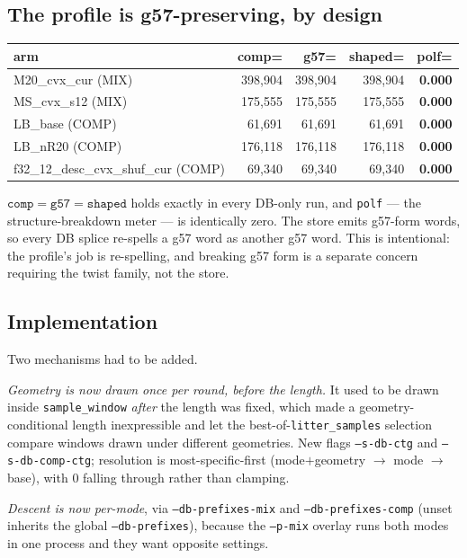 \documentclass[11pt]{article}
\newcommand{\code}[1]{\texttt{#1}}
\begin{document}
\subsection{The profile is g57-preserving, by design}

\begin{center}\small
\begin{tabular}{lrrrr}
\toprule
arm & comp= & g57= & shaped= & polf= \\
\midrule
M20\_cvx\_cur (MIX) & 398{,}904 & 398{,}904 & 398{,}904 & \textbf{0.000} \\
MS\_cvx\_s12 (MIX) & 175{,}555 & 175{,}555 & 175{,}555 & \textbf{0.000} \\
LB\_base (COMP) & 61{,}691 & 61{,}691 & 61{,}691 & \textbf{0.000} \\
LB\_nR20 (COMP) & 176{,}118 & 176{,}118 & 176{,}118 & \textbf{0.000} \\
f32\_12\_desc\_cvx\_shuf\_cur (COMP) & 69{,}340 & 69{,}340 & 69{,}340 & \textbf{0.000} \\
\bottomrule
\end{tabular}
\end{center}

$\code{comp}=\code{g57}=\code{shaped}$ holds exactly in every DB-only run, and
\code{polf} --- the structure-breakdown meter --- is identically zero. The store
emits g57-form words, so every DB splice re-spells a g57 word as another g57
word. This is intentional: the profile's job is re-spelling, and breaking g57
form is a separate concern requiring the twist family, not the store.

\subsection{Implementation}

Two mechanisms had to be added.

\emph{Geometry is now drawn once per round, before the length.} It used to be
drawn inside \code{sample\_window} \emph{after} the length was fixed, which
made a geometry-conditional length inexpressible and let the
best-of-\code{litter\_samples} selection compare windows drawn under different
geometries. New flags \code{--s-db-ctg} and \code{--s-db-comp-ctg}; resolution
is most-specific-first (mode$+$geometry $\rightarrow$ mode $\rightarrow$ base),
with 0 falling through rather than clamping.

\emph{Descent is now per-mode}, via \code{--db-prefixes-mix} and
\code{--db-prefixes-comp} (unset inherits the global \code{--db-prefixes}),
because the \code{--p-mix} overlay runs both modes in one process and they want
opposite settings.
\end{document}
